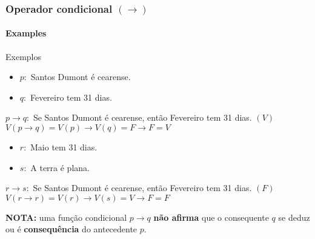 \begin{frame}[t]
    \frametitle{Operador condicional $(\rightarrow)$ }
    \framesubtitle{Examples}
    \small
    \begin{exampleblock}{Exemplos}
        \begin{itemize}
            \item[] $p:$ Santos Dumont é cearense.
            \item[] $q:$ Fevereiro tem 31 dias.
        \end{itemize}
        $p \rightarrow q:$ Se Santos Dumont é cearense, então Fevereiro tem 31 dias. $(V)$ \\[2pt]
        $V(p \rightarrow q) = V(p) \rightarrow V(q) = F \rightarrow F = V$
    \end{exampleblock}
    \vspace{-2mm}
    \begin{exampleblock}{}
        \begin{itemize}
            \item[] $r:$ Maio tem 31 dias.
            \item[] $s:$ A terra é plana. 
        \end{itemize}
        $r \rightarrow s:$ Se Santos Dumont é cearense, então Fevereiro tem 31 dias. $(F)$ \\[2pt]
        $V(r \rightarrow r) = V(r) \rightarrow V(s) = V \rightarrow F = F$
    \end{exampleblock}
    \vspace{-2mm}
    \begin{alertblock}{}
        \textbf{NOTA:} uma função condicional $p \rightarrow q$ \textbf{não afirma} que o consequente $q$ se deduz ou é \textbf{consequência} do antecedente $p$.
    \end{alertblock}
\end{frame}
%
